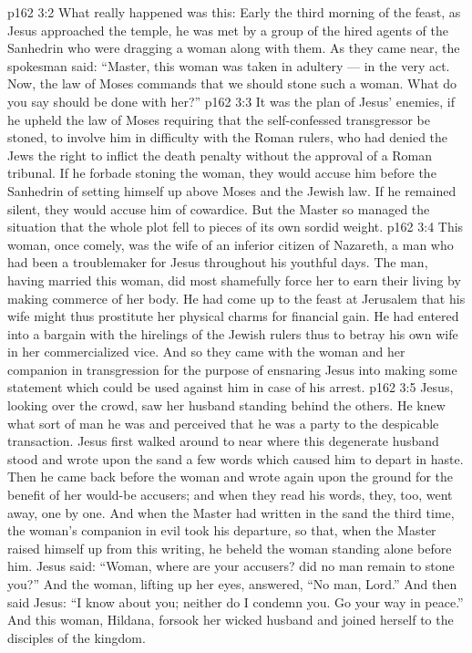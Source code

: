 \vs p162 3:2 What really happened was this: Early the third morning of the feast, as Jesus approached the temple, he was met by a group of the hired agents of the Sanhedrin who were dragging a woman along with them. As they came near, the spokesman said: “Master, this woman was taken in adultery --- in the very act. Now, the law of Moses commands that we should stone such a woman. What do you say should be done with her?”
\vs p162 3:3 It was the plan of Jesus’ enemies, if he upheld the law of Moses requiring that the self\hyp{}confessed transgressor be stoned, to involve him in difficulty with the Roman rulers, who had denied the Jews the right to inflict the death penalty without the approval of a Roman tribunal. If he forbade stoning the woman, they would accuse him before the Sanhedrin of setting himself up above Moses and the Jewish law. If he remained silent, they would accuse him of cowardice. But the Master so managed the situation that the whole plot fell to pieces of its own sordid weight.
\vs p162 3:4 This woman, once comely, was the wife of an inferior citizen of Nazareth, a man who had been a troublemaker for Jesus throughout his youthful days. The man, having married this woman, did most shamefully force her to earn their living by making commerce of her body. He had come up to the feast at Jerusalem that his wife might thus prostitute her physical charms for financial gain. He had entered into a bargain with the hirelings of the Jewish rulers thus to betray his own wife in her commercialized vice. And so they came with the woman and her companion in transgression for the purpose of ensnaring Jesus into making some statement which could be used against him in case of his arrest.
\vs p162 3:5 Jesus, looking over the crowd, saw her husband standing behind the others. He knew what sort of man he was and perceived that he was a party to the despicable transaction. Jesus first walked around to near where this degenerate husband stood and wrote upon the sand a few words which caused him to depart in haste. Then he came back before the woman and wrote again upon the ground for the benefit of her would\hyp{}be accusers; and when they read his words, they, too, went away, one by one. And when the Master had written in the sand the third time, the woman’s companion in evil took his departure, so that, when the Master raised himself up from this writing, he beheld the woman standing alone before him. Jesus said: \textcolor{ubdarkred}{“Woman, where are your accusers? did no man remain to stone you?”} And the woman, lifting up her eyes, answered, “No man, Lord.” And then said Jesus: \textcolor{ubdarkred}{“I know about you; neither do I condemn you. Go your way in peace.”} And this woman, Hildana, forsook her wicked husband and joined herself to the disciples of the kingdom.
